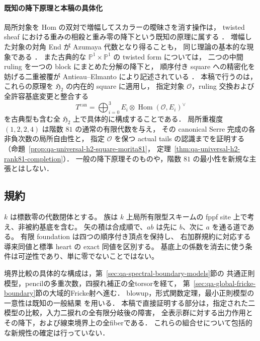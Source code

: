\documentclass[a4paper,11pt]{ltjsarticle}
\numberwithin{equation}{section}
\theoremstyle{plain}
\theoremstyle{definition}
\theoremstyle{remark}
\newcommand{\kk}{k}
\begin{document}
\paragraph{既知の降下原理と本稿の具体化}
局所対象を Hom の双対で増幅してスカラーの曖昧さを消す操作は，
twisted sheaf における重みの相殺と重み零の降下という既知の原理に属する
\cite[Lemma 2.1.1.13]{LieblichTwisted2007}
\cite[Lemma 3.1.1.7]{LieblichPeriodIndex2008}．
増幅した対象の対角 End が Azumaya 代数となり得ることも，
同じ理論の基本的な現象である
\cite[Proposition 3.1.2.1 and its proof]{LieblichPeriodIndex2008}．
また古典的な $\mathbb P^1\times\mathbb P^1$ の twisted form については，
二つの中間 ruling を一つの block にまとめた分解の降下と，
順序付き square への精密化を妨げる二重被覆が
Antieau--Elmanto により記述されている
\cite[Section 5.3, Proposition 5.7]{AntieauElmanto2021}．
本稿で行うのは，これらの原理を $\mathfrak H_2$ の内在的 square に適用し，
指定対象 $\mathcal O$，ruling 交換および全許容基底変更と整合する
\[
 T^{\mathrm{can}}
   =\bigoplus_{i=0}^3
       E_i\otimes\operatorname{Hom}(\mathcal O,E_i)^\vee
\]
を古典型も含む全 $\mathfrak H_2$ 上で具体的に構成することである．
局所重複度 $(1,2,2,4)$ は階数 $81$ の通常の有限代数を与え，
その canonical Serre 完成の各非負次数の局所自由性と，
指定 $\mathcal O$ を保つ actual tails の認識までを証明する
（命題~\ref{prop:qa-universal-h2-square-morita81}，
定理~\ref{thm:qa-universal-h2-rank81-completion}）．
一般の降下原理そのものや，階数 $81$ の最小性を新規な主張とはしない．


\subsection{規約}

$\kk$ は標数零の代数閉体とする。
族は $\kk$ 上局所有限型スキームの fppf site 上で考え、非被約基底を含む。
矢の積は合成順で、$ab$ は先に $b$、次に $a$ を通る道である。
有限 foundation は四つの順序付き頂点を保持し、
右加群規約に対応する導来同値と標準 heart の exact 同値を区別する。
基底上の係数を消去に使う条件は可逆性であり、単に零でないことではない。

境界比較の具体的な構成は，第~\ref{sec:qa-spectral-boundary-models}節の
共通正則模型，pencilの多重次数，四捩れ補正の全torsorを経て，
第~\ref{sec:qa-global-fricke-boundary}節の大域的Fricke射へ進む．
blowup，形式関数定理，最小正則模型の一意性は既知の一般結果
\cite{StacksBlowups,StacksFormalFunctions,StacksMinimalModels}を用いる．
本稿で直接証明する部分は，指定された二模型の比較，入力二捩れの全有限分岐後の障害，
全表示群に対する出力作用とその降下，および線束境界上の全fiberである．
これらの組合せについて包括的な新規性の確定は行っていない．
\end{document}
